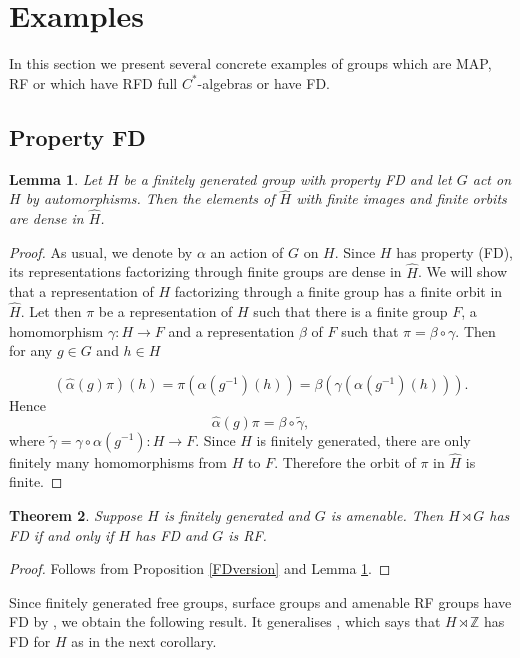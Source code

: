 \documentclass[11 pt, leqno, hidelinks]{amsart}%
\newtheorem{theorem}{Theorem}[section]
\theoremstyle{plain}
\newtheorem{lemma}[theorem]{Lemma}
\numberwithin{equation}{section}
\begin{document}
\section{Examples} \label{sec:Examples}


In this section we present several concrete examples of groups which are MAP, RF or which have RFD  full $C^*$-algebras or have FD.

\subsection{Property FD}

\begin{lemma}\label{FDfiniteorbits} Let $H$ be a finitely generated group with property FD and let $G$ act on $H$ by automorphisms. Then the elements of $\widehat H$ with finite images and finite orbits are dense in $\widehat H$.
\end{lemma}
\begin{proof} As usual, we denote by $\alpha$  an action of $G$ on $H$. Since $H$ has property (FD), its  representations factorizing through finite groups are dense in $\widehat H$.  We will show that a  representation  of $H$ factorizing through a finite group has a finite orbit in  $\widehat H$. Let then $\pi$ be a representation of $H$ such that there is a finite group $F$, a homomorphism $\gamma: H \to F$  and a representation $\beta$ of $F$ such that $\pi = \beta \circ \gamma$.  Then for any $g\in G$ and  $h\in H$

$$(\hat\alpha (g)\pi)(h) = \pi\left(\alpha (g^{-1})(h)\right) = \beta\left(\gamma(\alpha(g^{-1})(h))\right). $$ Hence $$\hat\alpha(g) \pi = \beta\circ \tilde \gamma, $$ where $\tilde \gamma = \gamma \circ \alpha(g^{-1}): H \to F$.
Since $H$ is finitely generated, there are only finitely many homomorphisms from $H$ to $F$. Therefore the orbit of $\pi$ in $\widehat H$ is finite.
\end{proof}

\begin{theorem} \label{thm:FDsemid}
	Suppose $H$ is finitely generated and $G$ is amenable. Then $H\rtimes G$ has FD if and only if $H$ has FD and $G$ is RF.
\end{theorem}
\begin{proof} Follows from Proposition \ref{FDversion} and Lemma \ref{FDfiniteorbits}.
\end{proof}

Since finitely generated free groups, surface groups and amenable RF groups have FD by \cite{LubotzkyShalom}, we obtain the following result. It generalises \cite[Th. 2.8]{LubotzkyShalom}, which says that $H\rtimes \mathbb Z$ has FD for $H$ as in the next corollary.
\end{document}
